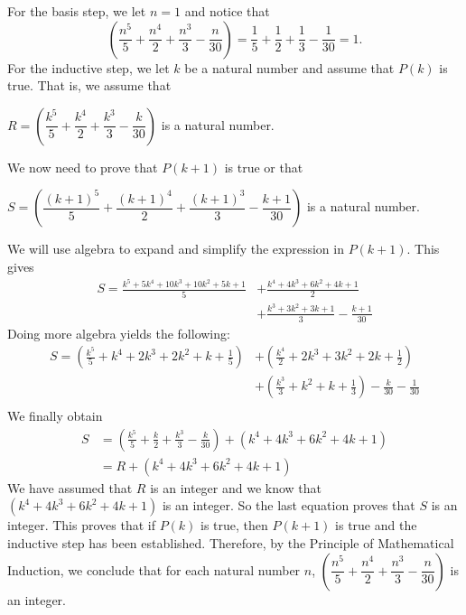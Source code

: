 \begin{enumerate}
For the basis step, we let $n = 1$ and notice that
\[
\left( \dfrac{n^5}{5} + \dfrac{n^4}{2} + \dfrac{n^3}{3} - \dfrac{n}{30} \right) = \frac{1}{5} + \frac{1}{2} + \frac{1}{3} - \frac{1}{30} = 1.
\]
For the inductive step, we let $k$ be a natural number and assume that $P(k)$ is true.  That is, we assume that
\begin{center}
$R = \left( \dfrac{k^5}{5} + \dfrac{k^4}{2} + \dfrac{k^3}{3} - \dfrac{k}{30} \right)$ is a natural number.
\end{center}
We now need to prove that $P(k+1)$ is true or that
\begin{center}
$S = \left( \dfrac{(k+1)^5}{5} + \dfrac{(k+1)^4}{2} + \dfrac{(k+1)^3}{3} - \dfrac{k+1}{30} \right)$ is a natural number.
\end{center}
We will use algebra to expand and simplify the expression in $P(k+1)$.  This gives
\begin{align*}
S = \frac{k^5 + 5k^4 + 10k^3 + 10k^2 + 5k + 1}{5} &+ \frac{k^4 + 4k^3 + 6k^2 + 4k + 1}{2} \\
&+ \frac{k^3 + 3k^2 + 3k + 1}{3} - \frac{k+1}{30}
\end{align*}
Doing more algebra yields the following:
\begin{align*}
S = \left( \frac{k^5}{5} + k^4 + 2k^3 + 2k^2 + k + \frac{1}{5} \right) &+ \left( \frac{k^4}{2} + 2k^3 + 3k^2 + 2k + \frac{1}{2} \right) \\
 &+ \left( \frac{k^3}{3} + k^2 + k + \frac{1}{3} \right) - \frac{k}{30} - \frac{1}{30} \\
\end{align*}
We finally obtain
\begin{align*}
S &= \left( \frac{k^5}{5} + \frac{k}{2} + \frac{k^3}{3} - \frac{k}{30} \right) + \left( k^4 + 4k^3 + 6k^2 + 4k + 1 \right) \\
&= R + \left( k^4 + 4k^3 + 6k^2 + 4k + 1 \right)
\end{align*}
We have assumed that $R$ is an integer and we know that $\left( k^4 + 4k^3 + 6k^2 + 4k + 1 \right)$ is an integer.  So the last equation proves that $S$ is an integer.  This proves that if 
$P(k)$ is true, then $P(k+1)$ is true and the inductive step has been established.  Therefore, by the Principle of Mathematical Induction, we conclude that for each natural number $n$, 
$\left( \dfrac{n^5}{5} + \dfrac{n^4}{2} + \dfrac{n^3}{3} - \dfrac{n}{30} \right)$ is an integer.







\end{enumerate}
